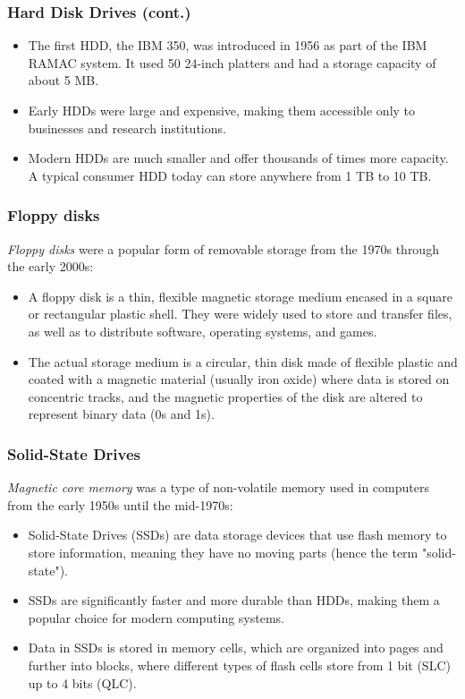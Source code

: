 \documentclass[aspectratio=169]{beamer}
\begin{document}
\begin{frame}
  \frametitle{Hard Disk Drives (cont.)}
  \begin{itemize}
    \item The first HDD, the IBM 350, was introduced in 1956 as part of the IBM RAMAC system. It used 50 24-inch platters and had a storage capacity of about 5 MB. \pause
    \item Early HDDs were large and expensive, making them accessible only to businesses and research institutions. \pause
    \item Modern HDDs are much smaller and offer thousands of times more capacity. A typical consumer HDD today can store anywhere from 1 TB to 10 TB. \pause
  \end{itemize}
\end{frame}

\begin{frame}
  \frametitle{Floppy disks}
  \textit{Floppy disks} were a popular form of removable storage from the 1970s through the early 2000s: \pause
  \begin{itemize}
    \item A floppy disk is a thin, flexible magnetic storage medium encased in a square or rectangular plastic shell. They were widely used to store and transfer files, as well as to distribute software, operating systems, and games. \pause
    \item The actual storage medium is a circular, thin disk made of flexible plastic and coated with a magnetic material (usually iron oxide) where data is stored on concentric tracks, and the magnetic properties of the disk are altered to represent binary data (0s and 1s). 
  \end{itemize}
\end{frame}

\begin{frame}
  \frametitle{Solid-State Drives}
  \textit{Magnetic core memory} was a type of non-volatile memory used in computers from the early 1950s until the mid-1970s: \pause
  \begin{itemize}
    \item Solid-State Drives (SSDs) are data storage devices that use flash memory to store information, meaning they have no moving parts (hence the term "solid-state"). \pause
    \item SSDs are significantly faster and more durable than HDDs, making them a popular choice for modern computing systems. \pause
    \item Data in SSDs is stored in memory cells, which are organized into pages and further into blocks, where different types of flash cells store from 1 bit (SLC) up to 4 bits (QLC).
  \end{itemize}
\end{frame}
\end{document}
